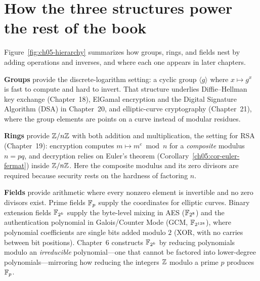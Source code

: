 \section{How the three structures power the rest of the book}
\label{ch05:roadmap}

Figure~\ref{fig:ch05-hierarchy} summarizes how groups, rings, and fields nest by adding operations and inverses, and where each one appears in later chapters.

\textbf{Groups} provide the discrete-logarithm setting: a cyclic group $\langle g \rangle$ where $x \mapsto g^x$ is fast to compute and hard to invert. That structure underlies Diffie--Hellman key exchange
(Chapter~18), ElGamal encryption and the Digital Signature Algorithm (DSA) in Chapter~20, and elliptic-curve cryptography
(Chapter~21), where the group elements are points on a curve instead of modular residues.

\textbf{Rings} provide $\mathbb{Z}/n\mathbb{Z}$ with both addition and multiplication, the setting for RSA
(Chapter~19): encryption computes $m \mapsto m^e \bmod n$ for a \emph{composite} modulus $n=pq$, and
decryption relies on Euler's theorem (Corollary~\ref{ch05:cor-euler-fermat}) inside $\mathbb{Z}/n\mathbb{Z}$. Here the composite modulus and its zero divisors are required because security rests on the hardness of factoring $n$.

\textbf{Fields} provide arithmetic where every nonzero element is invertible and no zero divisors exist. Prime fields
$\mathbb{F}_p$ supply the coordinates for elliptic curves. Binary extension fields
$\mathbb{F}_{2^k}$ supply the byte-level mixing in AES ($\mathbb{F}_{2^8}$) and the authentication polynomial in
Galois/Counter Mode (GCM, $\mathbb{F}_{2^{128}}$), where polynomial coefficients are single bits added modulo $2$ (XOR, with no carries between bit positions). Chapter~6 constructs $\mathbb{F}_{2^k}$ by reducing polynomials modulo an \emph{irreducible} polynomial---one that cannot be factored into lower-degree polynomials---mirroring how reducing the integers $\mathbb{Z}$ modulo a prime $p$ produces $\mathbb{F}_p$.

